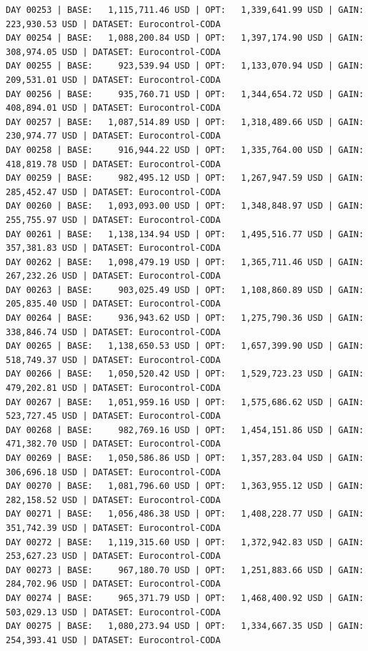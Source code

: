 \documentclass[11pt,a4paper]{article}
\begin{document}
\begin{verbatim}
DAY 00253 | BASE:   1,115,711.46 USD | OPT:   1,339,641.99 USD | GAIN: 223,930.53 USD | DATASET: Eurocontrol-CODA
DAY 00254 | BASE:   1,088,200.84 USD | OPT:   1,397,174.90 USD | GAIN: 308,974.05 USD | DATASET: Eurocontrol-CODA
DAY 00255 | BASE:     923,539.94 USD | OPT:   1,133,070.94 USD | GAIN: 209,531.01 USD | DATASET: Eurocontrol-CODA
DAY 00256 | BASE:     935,760.71 USD | OPT:   1,344,654.72 USD | GAIN: 408,894.01 USD | DATASET: Eurocontrol-CODA
DAY 00257 | BASE:   1,087,514.89 USD | OPT:   1,318,489.66 USD | GAIN: 230,974.77 USD | DATASET: Eurocontrol-CODA
DAY 00258 | BASE:     916,944.22 USD | OPT:   1,335,764.00 USD | GAIN: 418,819.78 USD | DATASET: Eurocontrol-CODA
DAY 00259 | BASE:     982,495.12 USD | OPT:   1,267,947.59 USD | GAIN: 285,452.47 USD | DATASET: Eurocontrol-CODA
DAY 00260 | BASE:   1,093,093.00 USD | OPT:   1,348,848.97 USD | GAIN: 255,755.97 USD | DATASET: Eurocontrol-CODA
DAY 00261 | BASE:   1,138,134.94 USD | OPT:   1,495,516.77 USD | GAIN: 357,381.83 USD | DATASET: Eurocontrol-CODA
DAY 00262 | BASE:   1,098,479.19 USD | OPT:   1,365,711.46 USD | GAIN: 267,232.26 USD | DATASET: Eurocontrol-CODA
DAY 00263 | BASE:     903,025.49 USD | OPT:   1,108,860.89 USD | GAIN: 205,835.40 USD | DATASET: Eurocontrol-CODA
DAY 00264 | BASE:     936,943.62 USD | OPT:   1,275,790.36 USD | GAIN: 338,846.74 USD | DATASET: Eurocontrol-CODA
DAY 00265 | BASE:   1,138,650.53 USD | OPT:   1,657,399.90 USD | GAIN: 518,749.37 USD | DATASET: Eurocontrol-CODA
DAY 00266 | BASE:   1,050,520.42 USD | OPT:   1,529,723.23 USD | GAIN: 479,202.81 USD | DATASET: Eurocontrol-CODA
DAY 00267 | BASE:   1,051,959.16 USD | OPT:   1,575,686.62 USD | GAIN: 523,727.45 USD | DATASET: Eurocontrol-CODA
DAY 00268 | BASE:     982,769.16 USD | OPT:   1,454,151.86 USD | GAIN: 471,382.70 USD | DATASET: Eurocontrol-CODA
DAY 00269 | BASE:   1,050,586.86 USD | OPT:   1,357,283.04 USD | GAIN: 306,696.18 USD | DATASET: Eurocontrol-CODA
DAY 00270 | BASE:   1,081,796.60 USD | OPT:   1,363,955.12 USD | GAIN: 282,158.52 USD | DATASET: Eurocontrol-CODA
DAY 00271 | BASE:   1,056,486.38 USD | OPT:   1,408,228.77 USD | GAIN: 351,742.39 USD | DATASET: Eurocontrol-CODA
DAY 00272 | BASE:   1,119,315.60 USD | OPT:   1,372,942.83 USD | GAIN: 253,627.23 USD | DATASET: Eurocontrol-CODA
DAY 00273 | BASE:     967,180.70 USD | OPT:   1,251,883.66 USD | GAIN: 284,702.96 USD | DATASET: Eurocontrol-CODA
DAY 00274 | BASE:     965,371.79 USD | OPT:   1,468,400.92 USD | GAIN: 503,029.13 USD | DATASET: Eurocontrol-CODA
DAY 00275 | BASE:   1,080,273.94 USD | OPT:   1,334,667.35 USD | GAIN: 254,393.41 USD | DATASET: Eurocontrol-CODA

\end{verbatim}
\end{document}
